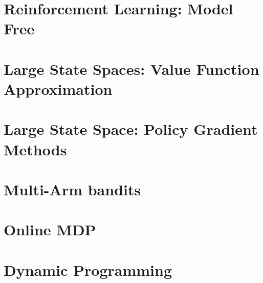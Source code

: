 \documentclass[12pt]{book}
\begin{document}
\chapter{Reinforcement Learning: Model Free}
\label{chapter:learning-model-free}


\chapter{Large State Spaces: Value Function Approximation}
\label{chapter:function-approximation}


\chapter{Large State Space: Policy Gradient Methods}
\label{chapter:policy-gradient}


\chapter{ Multi-Arm bandits}
\label{chapter:MAB}


\chapter{Online MDP}
\label{chapter:OnlineMDP}


% 

% 

% 

% 

\appendix

\chapter{Dynamic Programming}
\label{chapter:dp}




\end{document}
